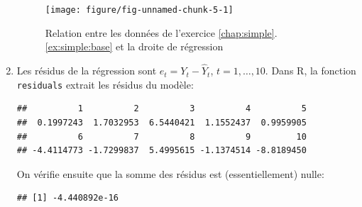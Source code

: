 \begin{solution}{2.1}
\begin{enumerate}
\begin{figure}
\begin{knitrout}
{\centering \texttt{[image: figure/fig-unnamed-chunk-5-1]}

}



\end{knitrout}
        \caption{Relation entre les données de l'exercice
          \ref{chap:simple}.\ref{ex:simple:base} et la droite de
          régression}
        \label{fig:simple:base2}
      \end{figure}
    \item Les résidus de la régression sont $e_t = Y_t - \hat{Y}_t$,
      $t = 1, \dots, 10$. Dans \textsf{R}, la fonction
      \texttt{residuals} extrait les résidus du modèle:
\begin{knitrout}
\color{fgcolor}\begin{kframe}
\begin{alltt}
\end{alltt}
\begin{verbatim}
##          1          2          3          4          5
##  0.1997243  1.7032953  6.5440421  1.1552437  0.9959905
##          6          7          8          9         10
## -4.4114773 -1.7299837  5.4995615 -1.1374514 -8.8189450
\end{verbatim}
\end{kframe}
\end{knitrout}
      On vérifie ensuite que la somme des résidus est
      (essentiellement) nulle:
\begin{knitrout}
\color{fgcolor}\begin{kframe}
\begin{alltt}
\hlstd{(}
\end{alltt}
\begin{verbatim}
## [1] -4.440892e-16
\end{verbatim}
\end{kframe}
\end{knitrout}
    \end{enumerate}
  
\end{solution}

